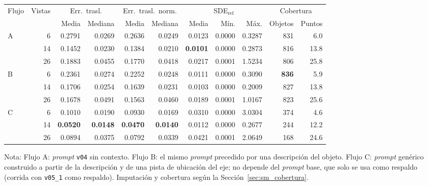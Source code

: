 \begin{table}[H]
\vspace{2ex}

\begin{tabular*}{\textwidth}{@{\extracolsep{\fill}}lrrrrrrrrrr@{}}
\toprule
\multirow{2}{*}{Flujo} & \multirow{2}{*}{Vistas} & \multicolumn{2}{c}{Err.\ trasl.} & \multicolumn{2}{c}{Err.\ trasl.\ norm.} & \multicolumn{3}{c}{SDE$_{\mathrm{ref}}$} & \multicolumn{2}{c}{Cobertura} \\
\cmidrule(lr){3-4} \cmidrule(lr){5-6} \cmidrule(lr){7-9} \cmidrule(lr){10-11}
 &  & Media & Mediana & Media & Mediana & Media & Mín. & Máx. & Objetos & Puntos \\
\midrule
\multirow{3}{*}{A} & 6 & 0.2791 & 0.0269 & 0.2636 & 0.0249 & 0.0123 & 0.0000 & 0.3287 & 831 & 6.0 \\
 & 14 & 0.1452 & 0.0230 & 0.1384 & 0.0210 & \textbf{0.0101} & 0.0000 & 0.2873 & 816 & 13.8 \\
 & 26 & 0.1883 & 0.0455 & 0.1770 & 0.0418 & 0.0217 & 0.0001 & 1.5234 & 806 & 25.8 \\
\midrule
\multirow{3}{*}{B} & 6 & 0.2361 & 0.0274 & 0.2252 & 0.0248 & 0.0111 & 0.0000 & 0.3090 & \textbf{836} & 5.9 \\
 & 14 & 0.1706 & 0.0254 & 0.1639 & 0.0231 & 0.0103 & 0.0000 & 0.2009 & 827 & 13.8 \\
 & 26 & 0.1678 & 0.0491 & 0.1563 & 0.0460 & 0.0189 & 0.0001 & 1.0167 & 823 & 25.6 \\
\midrule
\multirow{3}{*}{C} & 6 & 0.1010 & 0.0190 & 0.0930 & 0.0169 & 0.0310 & 0.0000 & 3.0304 & 374 & 4.6 \\
 & 14 & \textbf{0.0520} & \textbf{0.0148} & \textbf{0.0470} & \textbf{0.0140} & 0.0112 & 0.0000 & 0.2677 & 244 & 12.2 \\
 & 26 & 0.0894 & 0.0375 & 0.0792 & 0.0339 & 0.0421 & 0.0001 & 2.0649 & 168 & 24.6 \\
\bottomrule
\end{tabular*}

\vspace{1.5ex}
\begin{minipage}{\textwidth}
Nota: Flujo A: \textit{prompt} \texttt{v04} sin contexto. Flujo B: el mismo \textit{prompt} precedido por una descripción del objeto. Flujo C: \textit{prompt} genérico construido a partir de la descripción y de una pista de ubicación del eje; no depende del \textit{prompt} base, que solo se usa como respaldo (corrida con \texttt{v05\_1} como respaldo). Imputación y cobertura según la Sección~\ref{sec:sm_cobertura}.
\end{minipage}
\end{table}




